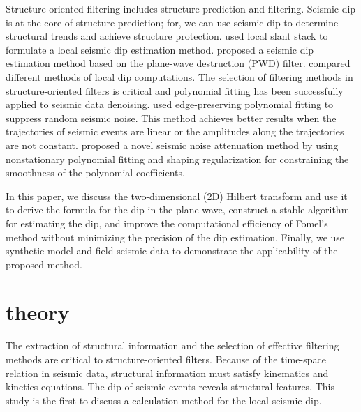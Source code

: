Structure-oriented filtering includes structure prediction and
filtering. Seismic dip is at the core of structure prediction; for, we
can use seismic dip to determine structural trends and achieve
structure protection. \cite{Ottolini82} used local slant stack to
formulate a local seismic dip estimation method. \cite{Fomel02}
proposed a seismic dip estimation method based on the plane-wave
destruction (PWD) filter. \cite{Schleicher09} compared different
methods of local dip computations. The selection of filtering methods
in structure-oriented filters is critical and polynomial fitting has
been successfully applied to seismic data denoising.
\cite{Lu09} used edge-preserving polynomial fitting
to suppress random seismic noise. This method achieves
better results when the trajectories of seismic events are
linear or the amplitudes along the trajectories are not
constant. \cite{Liu111} proposed a novel seismic noise
attenuation method by using nonstationary polynomial
fitting \cite[]{Fomel09} and shaping regularization \cite[]{Fomel07}
for constraining the smoothness of the polynomial coefficients.

In this paper, we discuss the two-dimensional (2D) Hilbert transform
and use it to derive the formula for the dip in the plane wave,
construct a stable algorithm for estimating the dip, and improve the
computational efficiency of Fomel's method \cite[]{Fomel02} without
minimizing the precision of the dip estimation.  Finally, we use
synthetic model and field seismic data to demonstrate the
applicability of the proposed method.

\section{theory}
The extraction of structural information and the selection of
effective filtering methods are critical to structure-oriented
filters. Because of the time-space relation in seismic data,
structural information must satisfy kinematics and kinetics
equations. The dip of seismic events reveals structural features. This
study is the first to discuss a calculation method for the local
seismic dip.

